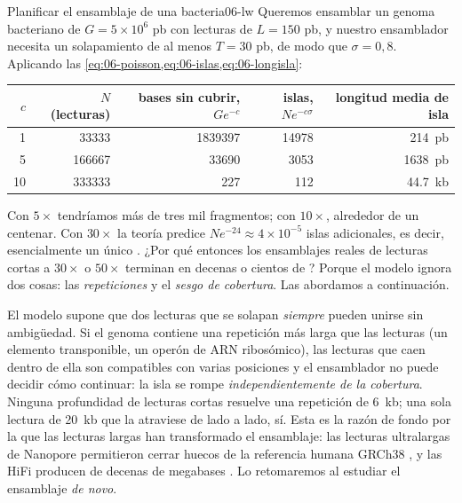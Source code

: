 \begin{ejemplo}{Planificar el ensamblaje de una bacteria}{06-lw}
Queremos ensamblar un genoma bacteriano de $G=5\times10^6$ pb con lecturas de $L=150$ pb, y nuestro ensamblador necesita un solapamiento de al menos $T=30$ pb, de modo que $\sigma=0{,}8$. Aplicando las \cref{eq:06-poisson,eq:06-islas,eq:06-longisla}:

\begin{center}
\small
\begin{tabular}{@{}rrrrr@{}}
\toprule
$c$ & $N$ (lecturas) & bases sin cubrir, $Ge^{-c}$ & islas, $Ne^{-c\sigma}$ & longitud media de isla\\
\midrule
1  & \num{33333}  & \num{1839397} & \num{14978} & \SI{214}{pb}\\
5  & \num{166667} & \num{33690}   & \num{3053}  & \SI{1638}{pb}\\
10 & \num{333333} & \num{227}     & \num{112}   & \SI{44,7}{kb}\\
\bottomrule
\end{tabular}
\end{center}

Con $5\times$ tendríamos más de tres mil fragmentos; con $10\times$, alrededor de un centenar. Con $30\times$ la teoría predice $Ne^{-24}\approx4\times10^{-5}$ islas adicionales, es decir, esencialmente un único . ¿Por qué entonces los ensamblajes reales de lecturas cortas a $30\times$ o $50\times$ terminan en decenas o cientos de ? Porque el modelo ignora dos cosas: las \emph{repeticiones} y el \emph{sesgo de cobertura}. Las abordamos a continuación.
\end{ejemplo}

\begin{profundizacion}
El modelo supone que dos lecturas que se solapan \emph{siempre} pueden unirse sin ambigüedad. Si el genoma contiene una repetición más larga que las lecturas (un elemento transponible, un operón de ARN ribosómico), las lecturas que caen dentro de ella son compatibles con varias posiciones y el ensamblador no puede decidir cómo continuar: la isla se rompe \emph{independientemente de la cobertura}. Ninguna profundidad de lecturas cortas resuelve una repetición de \SI{6}{kb}; una sola lectura de \SI{20}{kb} que la atraviese de lado a lado, sí. Esta es la razón de fondo por la que las lecturas largas han transformado el ensamblaje: las lecturas ultralargas de Nanopore permitieron cerrar huecos de la referencia humana GRCh38 \parencite{c06-jain2018}, y las HiFi producen  de decenas de megabases \parencite{c06-wenger2019}. Lo retomaremos al estudiar el ensamblaje \emph{de novo}.
\end{profundizacion}

